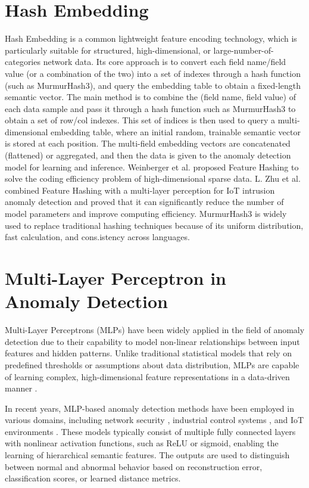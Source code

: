 \begin{ZhChapter}
    \section{Hash Embedding}
    Hash Embedding is a common lightweight feature encoding technology, which is particularly suitable for structured, high-dimensional, or large-number-of-categories network data. Its core approach is to convert each field name/field value (or a combination of the two) into a set of indexes through a hash function (such as MurmurHash3), and query the embedding table to obtain a fixed-length semantic vector.
    The main method is to combine the (field name, field value) of each data sample and pass it through a hash function such as MurmurHash3 to obtain a set of row/col indexes. This set of indices is then used to query a multi-dimensional embedding table, where an initial random, trainable semantic vector is stored at each position. The multi-field embedding vectors are concatenated (flattened) or aggregated, and then the data is given to the anomaly detection model for learning and inference.
    Weinberger et al. \cite{pang2021deep} proposed Feature Hashing to solve the coding efficiency problem of high-dimensional sparse data. L. Zhu et al. \cite{weinberger2009feature} combined Feature Hashing with a multi-layer perception for IoT intrusion anomaly detection and proved that it can significantly reduce the number of model parameters and improve computing efficiency. MurmurHash3 is widely used to replace traditional hashing techniques because of its uniform distribution, fast calculation, and cons.istency across languages.


    \section{Multi-Layer Perceptron in Anomaly Detection}
    Multi-Layer Perceptrons (MLPs) have been widely applied in the field of anomaly detection due to their capability to model non-linear relationships between input features and hidden patterns. Unlike traditional statistical models that rely on predefined thresholds or assumptions about data distribution, MLPs are capable of learning complex, high-dimensional feature representations in a data-driven manner \cite{lecun2015deep}.

    In recent years, MLP-based anomaly detection methods have been employed in various domains, including network security \cite{moustafa2019new}, industrial control systems \cite{kim2020cyber}, and IoT environments \cite{nguyen2020autoencoder}. These models typically consist of multiple fully connected layers with nonlinear activation functions, such as ReLU or sigmoid, enabling the learning of hierarchical semantic features. The outputs are used to distinguish between normal and abnormal behavior based on reconstruction error, classification scores, or learned distance metrics.


\end{ZhChapter}
